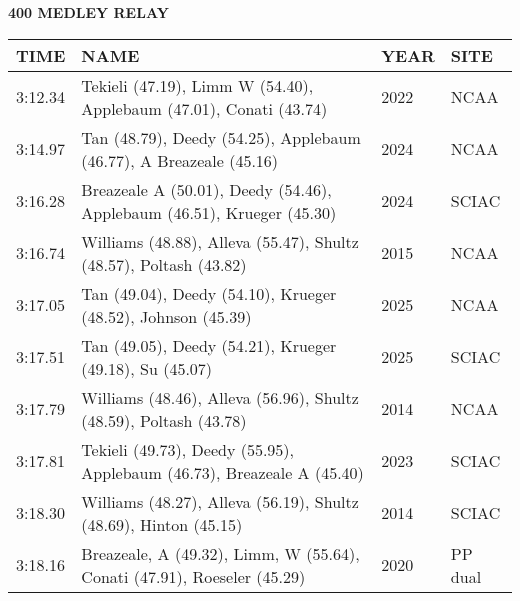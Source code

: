 \begin{table}[H]
\centering
\begin{minipage}[t]{0.6\textwidth}
\centering
\textbf{400 MEDLEY RELAY}\\[0.1cm]
\begin{tabular}{@{}p{1.8cm}p{2.8cm}p{1.2cm}p{1.4cm}@{}}
\hline
    \textbf{TIME} & \textbf{NAME} & \textbf{YEAR} & \textbf{SITE} \\
\hline
    3:12.34 & Tekieli (47.19), Limm W (54.40), Applebaum (47.01), Conati (43.74) & 2022 & NCAA \\
    3:14.97 & Tan (48.79), Deedy (54.25), Applebaum (46.77), A Breazeale (45.16) & 2024 & NCAA \\
    3:16.28 & Breazeale A (50.01), Deedy (54.46), Applebaum (46.51), Krueger (45.30) & 2024 & SCIAC \\
    3:16.74 & Williams (48.88), Alleva (55.47), Shultz (48.57), Poltash (43.82) & 2015 & NCAA \\
    3:17.05 & Tan (49.04), Deedy (54.10), Krueger (48.52), Johnson (45.39) & 2025 & NCAA \\
    3:17.51 & Tan (49.05), Deedy (54.21), Krueger (49.18), Su (45.07) & 2025 & SCIAC \\
    3:17.79 & Williams (48.46), Alleva (56.96), Shultz (48.59), Poltash (43.78) & 2014 & NCAA \\
    3:17.81 & Tekieli (49.73), Deedy (55.95), Applebaum (46.73), Breazeale A (45.40) & 2023 & SCIAC \\
    3:18.30 & Williams (48.27), Alleva (56.19), Shultz (48.69), Hinton (45.15) & 2014 & SCIAC \\
    3:18.16 & Breazeale, A (49.32), Limm, W (55.64), Conati (47.91), Roeseler (45.29) & 2020 & PP dual \\
\hline
\end{tabular}
\end{minipage}
\end{table}

